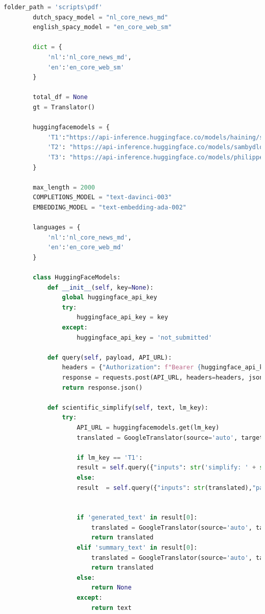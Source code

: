 \begin{center}
	\begin{lstlisting}[language=Python, caption={Script voor de derde fase van de vergelijkende studie}, label={code:verg-studie-phase-3}]		
		folder_path = 'scripts\pdf'
		dutch_spacy_model = "nl_core_news_md"
		english_spacy_model = "en_core_web_sm"
		
		dict = {
			'nl':'nl_core_news_md',
			'en':'en_core_web_sm'
		}
		
		total_df = None
		gt = Translator()
		
		huggingfacemodels = {
			'T1':"https://api-inference.huggingface.co/models/haining/scientific_abstract_simplification",
			'T2': "https://api-inference.huggingface.co/models/sambydlo/bart-large-scientific-lay-summarisation",
			'T3': "https://api-inference.huggingface.co/models/philippelaban/keep_it_simple"
		}
		
		max_length = 2000
		COMPLETIONS_MODEL = "text-davinci-003"
		EMBEDDING_MODEL = "text-embedding-ada-002"
		
		languages = {
			'nl':'nl_core_news_md',
			'en':'en_core_web_md'
		}
		
		class HuggingFaceModels:
			def __init__(self, key=None):
				global huggingface_api_key
				try:
					huggingface_api_key = key
				except:
					huggingface_api_key = 'not_submitted'
				
			def query(self, payload, API_URL):
				headers = {"Authorization": f"Bearer {huggingface_api_key}"}
				response = requests.post(API_URL, headers=headers, json=payload)
				return response.json()
			
			def scientific_simplify(self, text, lm_key):
				try:
					API_URL = huggingfacemodels.get(lm_key)
					translated = GoogleTranslator(source='auto', target='en').translate(str(text))
				
					if lm_key == 'T1':
					result = self.query({"inputs": str('simplify: ' + str(translated)),"parameters": {"max_length": len(sentence)+10},"options":{"wait_for_model":True}}, API_URL)
					else:
					result  = self.query({"inputs": str(translated),"parameters": {"max_length": len(sentence)+10},"options":{"wait_for_model":True}}, API_URL)
					
					
					if 'generated_text' in result[0]:
						translated = GoogleTranslator(source='auto', target='nl').translate(str(result[0]['generated_text']))
						return translated
					elif 'summary_text' in result[0]:
						translated = GoogleTranslator(source='auto', target='nl').translate(str(result[0]['summary_text']))
						return translated
					else:
						return None
					except:
						return text
		

\end{lstlisting}
\end{center}

